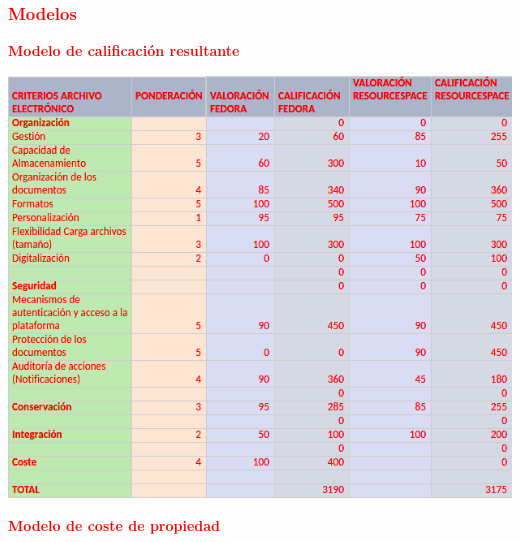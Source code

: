 \documentclass{article}
\begin{document}
\subsubsection{\textcolor{Red}{Modelos}}

\textcolor{Red}{\textbf{Modelo de calificación resultante}}

\begin{center}
\includegraphics[scale=0.5]{images/calificaciones.png}
\end{center}

\textcolor{Red}{\textbf{Modelo de coste de propiedad}}
\end{document}
